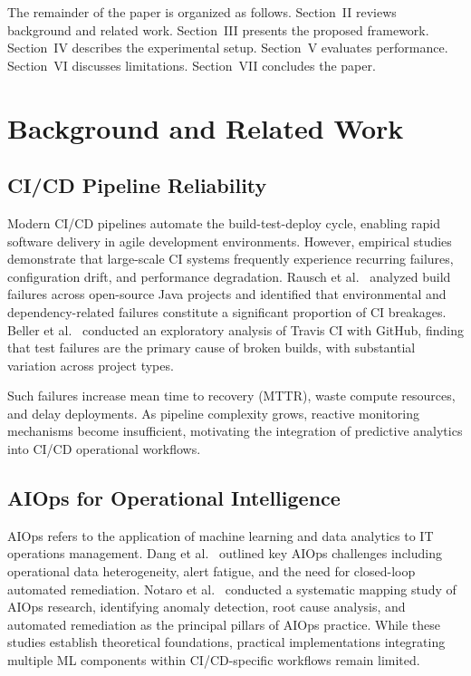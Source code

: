 \documentclass[conference]{IEEEtran}
\begin{document}
The remainder of the paper is organized as follows. Section~II reviews background and related work. Section~III presents the proposed framework. Section~IV describes the experimental setup. Section~V evaluates performance. Section~VI discusses limitations. Section~VII concludes the paper.

\section{Background and Related Work}

\subsection{CI/CD Pipeline Reliability}

Modern CI/CD pipelines automate the build-test-deploy cycle, enabling rapid software delivery in agile development environments. However, empirical studies demonstrate that large-scale CI systems frequently experience recurring failures, configuration drift, and performance degradation. Rausch et al.~\cite{rausch2017empirical} analyzed build failures across open-source Java projects and identified that environmental and dependency-related failures constitute a significant proportion of CI breakages. Beller et al.~\cite{beller2017oops} conducted an exploratory analysis of Travis CI with GitHub, finding that test failures are the primary cause of broken builds, with substantial variation across project types.

Such failures increase mean time to recovery (MTTR), waste compute resources, and delay deployments. As pipeline complexity grows, reactive monitoring mechanisms become insufficient, motivating the integration of predictive analytics into CI/CD operational workflows.

\subsection{AIOps for Operational Intelligence}

AIOps refers to the application of machine learning and data analytics to IT operations management. Dang et al.~\cite{dang2019aiops} outlined key AIOps challenges including operational data heterogeneity, alert fatigue, and the need for closed-loop automated remediation. Notaro et al.~\cite{notaro2021aiops} conducted a systematic mapping study of AIOps research, identifying anomaly detection, root cause analysis, and automated remediation as the principal pillars of AIOps practice. While these studies establish theoretical foundations, practical implementations integrating multiple ML components within CI/CD-specific workflows remain limited.
\end{document}
